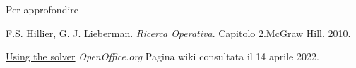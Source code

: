 \documentclass{beamer}
\begin{document}
\begin{frame}{Per approfondire}
\beamertemplatebookbibitems
\begin{thebibliography}{References}
F.S. Hillier, G. J. Lieberman.\newblock
\textit{Ricerca Operativa}. Capitolo 2.\newblock McGraw Hill, 2010.

\href{https://wiki.openoffice.org/wiki/Documentation/OOo3/_User/_Guides/Calc/_Guide/Solver}{Using the solver} \newblock \textit{OpenOffice.org} \newblock Pagina wiki consultata il 14 aprile 2022.



\end{thebibliography}
\end{frame}
\end{document}
